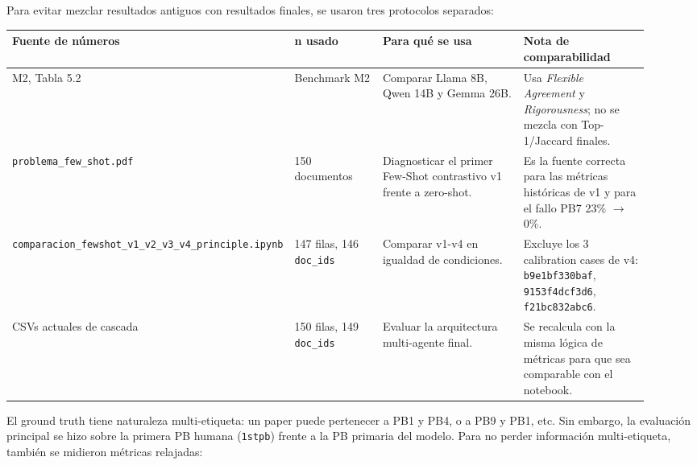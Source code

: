 Para evitar mezclar resultados antiguos con resultados finales, se usaron tres protocolos separados:

\begin{center}
\scriptsize
\setlength{\tabcolsep}{4pt}
\renewcommand{\arraystretch}{1.15}
\begin{tabular}{p{0.23\linewidth}p{0.16\linewidth}p{0.30\linewidth}p{0.23\linewidth}}
\toprule
Fuente de números & n usado & Para qué se usa & Nota de comparabilidad \\
\midrule
M2, Tabla 5.2 & Benchmark M2 & Comparar Llama 8B, Qwen 14B y Gemma 26B. & Usa \emph{Flexible Agreement} y \emph{Rigorousness}; no se mezcla con Top-1/Jaccard finales. \\
\texttt{problema\_few\_shot.pdf} & 150 documentos & Diagnosticar el primer Few-Shot contrastivo v1 frente a zero-shot. & Es la fuente correcta para las métricas históricas de v1 y para el fallo PB7 23\% $\rightarrow$ 0\%. \\
\texttt{comparacion\_fewshot\_v1\_v2\_v3\_v4\_principle.ipynb} & 147 filas, 146 \texttt{doc\_ids} & Comparar v1-v4 en igualdad de condiciones. & Excluye los 3 calibration cases de v4: \texttt{b9e1bf330baf}, \texttt{9153f4dcf3d6}, \texttt{f21bc832abc6}. \\
CSVs actuales de cascada & 150 filas, 149 \texttt{doc\_ids} & Evaluar la arquitectura multi-agente final. & Se recalcula con la misma lógica de métricas para que sea comparable con el notebook. \\
\bottomrule
\end{tabular}
\end{center}

El ground truth tiene naturaleza multi-etiqueta: un paper puede pertenecer a PB1 y PB4, o a PB9 y PB1, etc. Sin embargo, la evaluación principal se hizo sobre la primera PB humana (\texttt{1stpb}) frente a la PB primaria del modelo. Para no perder información multi-etiqueta, también se midieron métricas relajadas:

